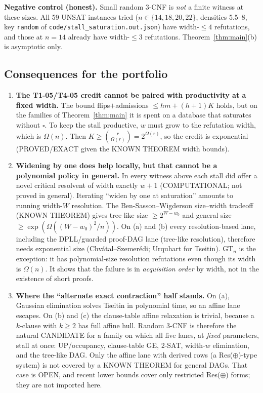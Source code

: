 \documentclass[11pt]{article}
\theoremstyle{definition}
\begin{document}
\textbf{Negative control (honest).} Small random 3-CNF is \emph{not} a finite witness at these sizes. All 59 UNSAT instances tried ($n\in\{14,18,20,22\}$, densities 5.5--8, key \texttt{random} of \texttt{code/stall\_saturation.out.json}) have width-$\le4$ refutations, and those at $n=14$ already have width-$\le3$ refutations. Theorem~\ref{thm:main}(b) is asymptotic only.

\subsection*{Consequences for the portfolio}
\begin{enumerate}
\item \textbf{The T1-05/T4-05 credit cannot be paired with productivity at a fixed width.} The bound flips$+$admissions $\le hm+(h+1)K$ holds, but on the families of Theorem~\ref{thm:main} it is spent on a database that saturates without $\square$. To keep the stall productive, $w$ must grow to the refutation width, which is $\Omega(n)$. Then $K\ge\binom{r}{\Omega(r)}=2^{\Omega(r)}$, so the credit is exponential (PROVED/EXACT given the KNOWN THEOREM width bounds).
\item \textbf{Widening by one does help locally, but that cannot be a polynomial policy in general.} In every witness above each stall did offer a novel critical resolvent of width exactly $w+1$ (COMPUTATIONAL; not proved in general). Iterating ``widen by one at saturation'' amounts to running width-$W$ resolution. The Ben-Sasson--Wigderson size--width tradeoff (KNOWN THEOREM) gives tree-like size $\ge 2^{W-w_0}$ and general size $\ge\exp(\Omega((W-w_0)^2/n))$. On (a) and (b) every resolution-based lane, including the DPLL/guarded proof-DAG lane (tree-like resolution), therefore needs exponential size (Chv\'atal--Szemer\'edi; Urquhart for Tseitin). GT$_n$ is the exception: it has polynomial-size resolution refutations even though its width is $\Omega(n)$. It shows that the failure is in \emph{acquisition order} by width, not in the existence of short proofs.
\item \textbf{Where the ``alternate exact contraction'' half stands.} On (a), Gaussian elimination solves Tseitin in polynomial time, so an affine lane escapes. On (b) and (c) the clause-table affine relaxation is trivial, because a $k$-clause with $k\ge2$ has full affine hull. Random 3-CNF is therefore the natural CANDIDATE for a family on which all five lanes, at \emph{fixed} parameters, stall at once: UP/occupancy, clause-table GE, 2-SAT, width-$w$ elimination, and the tree-like DAG. Only the affine lane with derived rows (a Res($\oplus$)-type system) is not covered by a KNOWN THEOREM for general DAGs. That case is OPEN, and recent lower bounds cover only restricted Res($\oplus$) forms; they are not imported here.
\end{enumerate}
\end{document}
